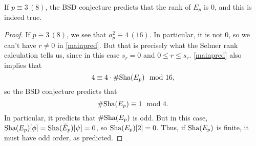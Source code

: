 \documentclass[12pt, a4paper]{amsart}
\begin{document}
\begin{thm} \label{mainthm1}
  If $p \equiv 3 \, (8)$, the BSD conjecture predicts
  that the rank of $E_p$ is 0, and this is indeed true.
\end{thm}

\begin{proof}
  If $p \equiv 3 \, (8)$, we see that $a_p^2 \equiv 4 \,
  (16).$ In particular,
  it is not 0, so we can't have $r \neq 0$ in \autoref{mainpred}. 
  But that is precisely what the Selmer rank calculation tells us, since in this
  case $s_r =
  0$ and $0 \leq r \leq s_r.$
  \autoref{mainpred} also implies that
  \[4 \equiv 4 \cdot \# \text{\normalfont Sha}(E_p) \mod{16},\]
  so the BSD conjecture predicts that
  \[\# \text{\normalfont Sha}(E_p) \equiv 1 \mod{4}.\]
  In particular, it predicts that $\#\text{\normalfont Sha}(E_p)$ is odd.
  But in this case, $\text{\normalfont Sha}(E_p)[\phi] = \text{\normalfont Sha}(\bar{E}_p)[\psi] = 0$, so
  $\text{\normalfont Sha}(E_p)[2] = 0$. Thus, if $\text{\normalfont Sha}(E_p)$ is finite, it must have odd order, as predicted.

\end{proof}

\printbibliography
\end{document}
